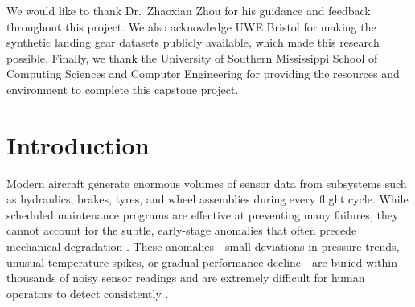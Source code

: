 \documentclass{CLS_zhou430}
\begin{document}
\frontmatter


\begin{abstract}
This capstone project addresses the challenge of detecting early-stage anomalies in aircraft landing gear sensor data, which are difficult for human operators to identify due to the high volume, noise, and temporal complexity of maintenance records. We design and implement an Aircraft Maintenance Anomaly Detection System that applies multiple machine learning and statistical methods---including Z-Score analysis, Isolation Forest, K-Means clustering, DBSCAN, One-Class SVM, and LSTM Autoencoders---to six synthetic time-series datasets generated from real Airbus landing gear systems. The system also estimates Remaining Useful Life (RUL) of hydraulic and tyre pressure components via linear trend extrapolation. An interactive Streamlit dashboard provides visualization and decision-support capabilities for maintenance personnel. Evaluation across 278,000 data points shows that Isolation Forest and Z-Score methods are the most effective for point-level anomaly detection, while LSTM Autoencoders excel at identifying anomalous flight sequences. The system is designed as a decision-support aid---not for autonomous maintenance decisions---in accordance with real-world aviation practices.
\end{abstract}


\begin{acknowledgments}
We would like to thank Dr.\ Zhaoxian Zhou for his guidance and feedback throughout this project. We also acknowledge UWE Bristol for making the synthetic landing gear datasets publicly available, which made this research possible. Finally, we thank the University of Southern Mississippi School of Computing Sciences and Computer Engineering for providing the resources and environment to complete this capstone project.
\end{acknowledgments}

\makelists


\chapter{Introduction} \label{chap:intro}

Modern aircraft generate enormous volumes of sensor data from subsystems such as hydraulics, brakes, tyres, and wheel assemblies during every flight cycle. While scheduled maintenance programs are effective at preventing many failures, they cannot account for the subtle, early-stage anomalies that often precede mechanical degradation \cite{carvalho2019systematic}. These anomalies---small deviations in pressure trends, unusual temperature spikes, or gradual performance decline---are buried within thousands of noisy sensor readings and are extremely difficult for human operators to detect consistently \cite{chandola2009anomaly}.
\end{document}
